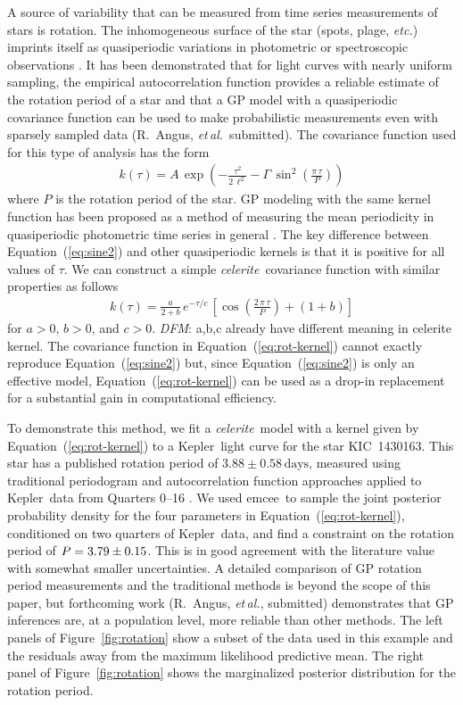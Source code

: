 \documentclass[manuscript, letterpaper]{aastex6}
\newcommand{\project}[1]{\textsf{#1}}
\newcommand{\kepler}{\project{Kepler}}
\newcommand{\celeriteterm}{\emph{celerite}}
\newcommand{\emcee}{\project{emcee}}
\newcommand{\foreign}[1]{\emph{#1}}
\newcommand{\etal}{\foreign{et\,al.}}
\newcommand{\etc}{\foreign{etc.}}
\newcommand{\figureref}[1]{\ref{fig:#1}}
\newcommand{\Figure}[1]{Figure~\figureref{#1}}
\renewcommand{\eqref}[1]{\ref{eq:#1}}
\newcommand{\Eq}[1]{Equation~(\eqref{#1})}
\newcommand{\eq}[1]{\Eq{#1}}
\newcommand{\eqlabel}[1]{\label{eq:#1}}
\newcommand{\todo}[3]{{\color{#2}\emph{#1}: #3}}
\newcommand{\dfmtodo}[1]{\todo{DFM}{red}{#1}}
\begin{document}
A source of variability that can be measured from time series measurements of
stars is rotation.
The inhomogeneous surface of the star (spots, plage, \etc) imprints itself as
quasiperiodic variations in photometric or spectroscopic observations
\citep{Dumusque:2014}.
It has been demonstrated that for light curves with nearly uniform sampling,
the empirical autocorrelation function provides a reliable estimate of the
rotation period of a star \citep{Mcquillan:2013, Mcquillan:2014, Aigrain:2015}
and that a GP model with a
quasiperiodic covariance function can be used to make probabilistic
measurements even with sparsely sampled data (R.~Angus, \etal\ submitted).
The covariance function used for this type of analysis has the form
\begin{eqnarray}\eqlabel{sine2}
k(\tau) = A\,\exp\left(-\frac{\tau^2}{2\,\ell^2} -
    \Gamma\,\sin^2\left(\frac{\pi\,\tau}{P} \right) \right)
\end{eqnarray}
where $P$ is the rotation period of the star.
GP modeling with the same kernel function has been proposed as a method of
measuring the mean periodicity in quasiperiodic photometric time series in
general \citep{Wang:2012}.
The key difference between \eq{sine2} and other quasiperiodic kernels is that
it is positive for all values of $\tau$.
We can construct a simple \celeriteterm\ covariance function with similar properties
as follows
\begin{eqnarray}\eqlabel{rot-kernel}
k(\tau) = \frac{a}{2+b}\,e^{-\tau/c}\,\left[
    \cos\left(\frac{2\,\pi\,\tau}{P}\right) + (1 + b)
\right]
\end{eqnarray}
for $a>0$, $b>0$, and $c>0$. \dfmtodo{a,b,c already have different meaning
in celerite kernel.}
The covariance function in \eq{rot-kernel} cannot exactly reproduce \eq{sine2}
but, since \eq{sine2} is only an effective model, \eq{rot-kernel} can be used
as a drop-in replacement for a substantial gain in computational efficiency.

To demonstrate this method, we fit a \celeriteterm\ model with a kernel given
by \eq{rot-kernel} to a \kepler\ light curve for the star KIC~1430163.
This star has a published rotation period of $3.88 \pm 0.58\,\mathrm{days}$,
measured using traditional periodogram and autocorrelation function approaches
applied to \kepler\ data from Quarters 0--16 \citep{Mathur:2014}.
We used \emcee\ to sample the joint posterior probability density for the four
parameters in \eq{rot-kernel}, conditioned on two quarters of \kepler\ data,
and find a constraint on the rotation period of $P = {3.79 \pm 0.15}$.
This is in good agreement with the literature value with somewhat smaller
uncertainties.
A detailed comparison of GP rotation period measurements and the traditional
methods is beyond the scope of this paper, but forthcoming work (R.~Angus,
\etal, submitted) demonstrates that GP inferences are, at a population level,
more reliable than other methods.
The left panels of \Figure{rotation} show a subset of the data used in this
example and the residuals away from the maximum likelihood predictive mean.
The right panel of \Figure{rotation} shows the marginalized posterior
distribution for the rotation period.
\end{document}
